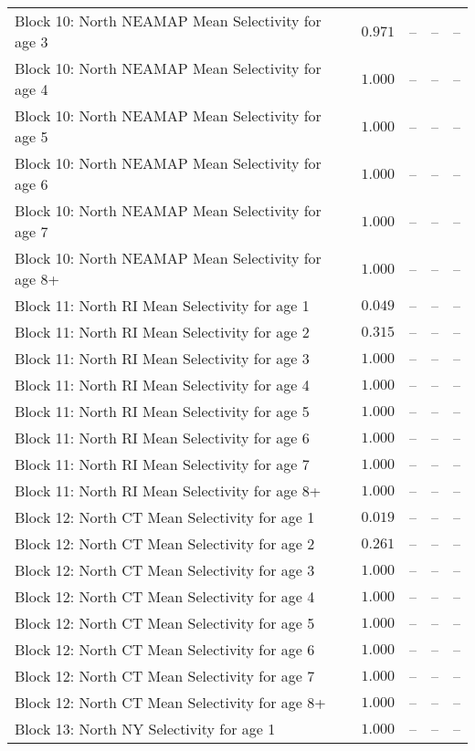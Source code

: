 \documentclass[
]{article}
\begin{document}
\begin{landscape}
\begin{longtable}[t]{lrrrr}
Block 10: North NEAMAP Mean Selectivity for age 3 & $0.971$ & -- & -- & --\\
Block 10: North NEAMAP Mean Selectivity for age 4 & $1.000$ & -- & -- & --\\
Block 10: North NEAMAP Mean Selectivity for age 5 & $1.000$ & -- & -- & --\\
Block 10: North NEAMAP Mean Selectivity for age 6 & $1.000$ & -- & -- & --\\
\addlinespace
Block 10: North NEAMAP Mean Selectivity for age 7 & $1.000$ & -- & -- & --\\
Block 10: North NEAMAP Mean Selectivity for age 8+ & $1.000$ & -- & -- & --\\
Block 11: North RI Mean Selectivity for age 1 & $0.049$ & -- & -- & --\\
Block 11: North RI Mean Selectivity for age 2 & $0.315$ & -- & -- & --\\
Block 11: North RI Mean Selectivity for age 3 & $1.000$ & -- & -- & --\\
\addlinespace
Block 11: North RI Mean Selectivity for age 4 & $1.000$ & -- & -- & --\\
Block 11: North RI Mean Selectivity for age 5 & $1.000$ & -- & -- & --\\
Block 11: North RI Mean Selectivity for age 6 & $1.000$ & -- & -- & --\\
Block 11: North RI Mean Selectivity for age 7 & $1.000$ & -- & -- & --\\
Block 11: North RI Mean Selectivity for age 8+ & $1.000$ & -- & -- & --\\
\addlinespace
Block 12: North CT Mean Selectivity for age 1 & $0.019$ & -- & -- & --\\
Block 12: North CT Mean Selectivity for age 2 & $0.261$ & -- & -- & --\\
Block 12: North CT Mean Selectivity for age 3 & $1.000$ & -- & -- & --\\
Block 12: North CT Mean Selectivity for age 4 & $1.000$ & -- & -- & --\\
Block 12: North CT Mean Selectivity for age 5 & $1.000$ & -- & -- & --\\
\addlinespace
Block 12: North CT Mean Selectivity for age 6 & $1.000$ & -- & -- & --\\
Block 12: North CT Mean Selectivity for age 7 & $1.000$ & -- & -- & --\\
Block 12: North CT Mean Selectivity for age 8+ & $1.000$ & -- & -- & --\\
Block 13: North NY Selectivity for age 1 & $1.000$ & -- & -- & --\\

\end{longtable}
\end{landscape}
\end{document}
